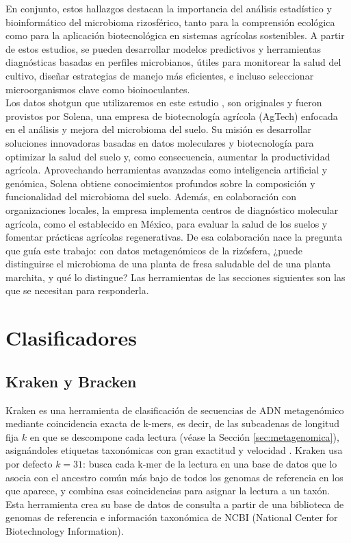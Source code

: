 En conjunto, estos hallazgos destacan la importancia del análisis estadístico 
y bioinformático del microbioma rizosférico, tanto para la comprensión ecológica 
como para la aplicación biotecnológica en sistemas agrícolas sostenibles. 
A partir de estos estudios, se pueden desarrollar modelos predictivos y herramientas 
diagnósticas basadas en perfiles microbianos, útiles para monitorear la salud del cultivo, 
diseñar estrategias de manejo más eficientes, e incluso seleccionar microorganismos 
clave como bioinoculantes. \\


Los datos shotgun que utilizaremos en este estudio , son originales y fueron provistos por Solena,
una empresa de biotecnología agrícola (AgTech) enfocada en el análisis y 
mejora del microbioma del suelo. Su misión es desarrollar soluciones innovadoras 
basadas en datos moleculares y biotecnología para optimizar la salud del suelo y, 
como consecuencia, aumentar la productividad agrícola. Aprovechando herramientas avanzadas 
como inteligencia artificial y genómica, Solena obtiene conocimientos profundos sobre 
la composición y funcionalidad del microbioma del suelo. Además, en colaboración con 
organizaciones locales, la empresa implementa centros de diagnóstico molecular agrícola, 
como el establecido en México, para evaluar la salud de los suelos y fomentar prácticas 
agrícolas regenerativas. De esa colaboración nace la pregunta que guía este trabajo: con datos
metagenómicos de la rizósfera, ¿puede distinguirse el microbioma de una planta de fresa saludable del
de una planta marchita, y qué lo distingue? Las herramientas de las secciones siguientes son las que
se necesitan para responderla.


\section{Clasificadores}

\subsection{Kraken y Bracken}
Kraken es una herramienta de clasificación de secuencias de ADN metagenómico mediante coincidencia exacta de
k-mers, es decir, de las subcadenas de longitud fija $k$ en que se descompone cada lectura (véase la
Sección \ref{sec:metagenomica}), asignándoles etiquetas taxonómicas con gran exactitud y velocidad
\citep{wood2014kraken}. Kraken usa por defecto $k = 31$: busca cada k-mer de la lectura en una base de datos que lo
asocia con el ancestro común más bajo de todos los genomas de referencia en los que aparece, y combina esas
coincidencias para asignar la lectura a un taxón.
Esta herramienta crea su base de datos de consulta a partir de una biblioteca de genomas de referencia e información 
taxonómica de NCBI (National Center for Biotechnology Information).\\

